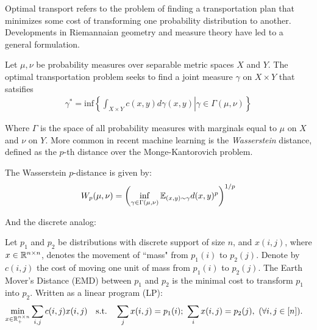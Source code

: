 Optimal transport refers to the problem of finding
a transportation plan that minimizes some cost of transforming
one probability distribution to another.
Developments in Riemannaian geometry and measure theory 
have led to a general formulation.
\begin{definition}\label{def:mongekant}
	Let $\mu,\nu$ be probability measures over separable metric spaces $X$ and $Y$.
	The optimal transportation problem seeks to find a joint measure $\gamma$ on $X\times Y$
	that satsifies
	\begin{align}
	\gamma^* = \text{inf} \left\{\left. \int_{X\times Y} c(x,y) d\gamma(x,y) \right| \gamma \in \Gamma(\mu,\nu) \right\}
	\end{align}
\end{definition}
Where $\Gamma$ is the space of all probability measures with marginals equal to $\mu$ on $X$ and $\nu$ on $Y$.
More common in recent machine learning is the \textit{Wasserstein} distance,
defined as the $p$-th distance over the Monge-Kantorovich problem.
\begin{definition}\label{def:wassmetric}
	The Wasserstein $p$-distance is given by:
	\begin{align}
	W_p(\mu, \nu) = \left( \inf_{\gamma \in \Gamma(\mu, \nu)} \mathbb{E}_{(x, y) \sim \gamma} d(x, y)^p \right)^{1/p}
	\end{align}
\end{definition}
And the discrete analog:
\begin{definition}
	Let $p_1$ and $p_2$ be distributions with discrete support of size $n$, and $x(i,j)$, where  $x\in\mathbb{R}^{n\times n}$, denotes the movement of ``mass" from $p_1(i)$ to $p_2(j)$.
	Denote by $c(i,j)$ the cost of moving one unit of mass from  $p_1(i)$ to $p_2(j)$.
	The Earth Mover's Distance (EMD) between $p_1$ and $p_2$ is the minimal cost to transform $p_1$ into $p_2$.
	Written as a linear program (LP):
	\begin{align}\label{eq:2d-emd}
	\begin{aligned}
	\underset{{x\in \RR^{n\times n}_+}}{\textrm{min}} \sum_{i,j} c(i,j) x(i,j) \quad  \textrm{s.t.}\quad \sum_j x(i,j) &= p_1(i); \ 
	\sum_i x(i,j) = p_2(j),\ (\forall i,j\in[n]).
	\end{aligned}
	\end{align}
\end{definition}
